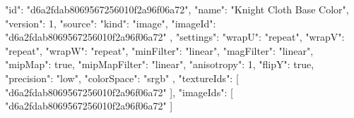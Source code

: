 {
  "id": "d6a2fdab8069567256010f2a96f06a72",
  "name": "Knight Cloth Base Color",
  "version": 1,
  "source": {
    "kind": "image",
    "imageId": "d6a2fdab8069567256010f2a96f06a72"
  },
  "settings": {
    "wrapU": "repeat",
    "wrapV": "repeat",
    "wrapW": "repeat",
    "minFilter": "linear",
    "magFilter": "linear",
    "mipMap": true,
    "mipMapFilter": "linear",
    "anisotropy": 1,
    "flipY": true,
    "precision": "low",
    "colorSpace": "srgb"
  },
  "textureIds": [
    "d6a2fdab8069567256010f2a96f06a72"
  ],
  "imageIds": [
    "d6a2fdab8069567256010f2a96f06a72"
  ]
}
